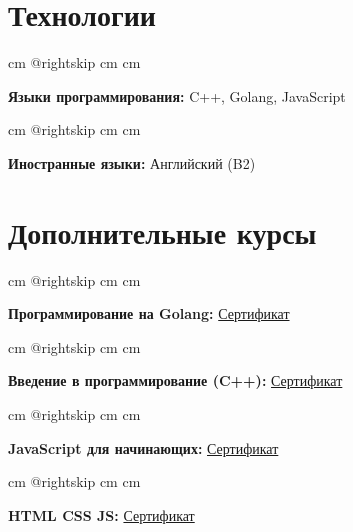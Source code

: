 \documentclass[12pt, letterpaper]{article}
\let\hrefWithoutArrow\href
\renewcommand{\href}[2]{\hrefWithoutArrow{#1}{\mbox{\ifthenelse{\equal{#2}{}}{ }{#2 }\raisebox{.15ex}{\footnotesize \faExternalLink*}}}}
\begin{document}
    


    \section{Технологии}

        \begingroup{} cm
        \advance\csname @rightskip cm
        \advance{} cm

        \textbf{Языки программирования:} C++, Golang, JavaScript \par\endgroup

        \vspace{0.2 cm}
        \begingroup{} cm
        \advance\csname @rightskip cm
        \advance{} cm

        \textbf{Иностранные языки:} Английский (B2) \par\endgroup

    \section{Дополнительные курсы}

        \begingroup{} cm
        \advance\csname @rightskip cm
        \advance{} cm

        \textbf{Программирование на Golang:} \mbox{\hrefWithoutArrow{https://stepik.org/cert/2144361}{Сертификат}} \par\endgroup

        \vspace{0.2 cm}
        \begingroup{} cm
        \advance\csname @rightskip cm
        \advance{} cm

        \textbf{Введение в программирование (C++):} \mbox{\hrefWithoutArrow{https://stepik.org/cert/1185579}{Сертификат}} \par\endgroup

        \vspace{0.2 cm}
        \begingroup{} cm
        \advance\csname @rightskip cm
        \advance{} cm

        \textbf{JavaScript для начинающих:} \mbox{\hrefWithoutArrow{https://stepik.org/cert/2151305}{Сертификат}} \par\endgroup

        \vspace{0.2 cm}
        \begingroup{} cm
        \advance\csname @rightskip cm
        \advance{} cm

        \textbf{HTML CSS JS:} \mbox{\hrefWithoutArrow{https://stepik.org/cert/2152277}{Сертификат}} \par\endgroup

    
\end{document}
